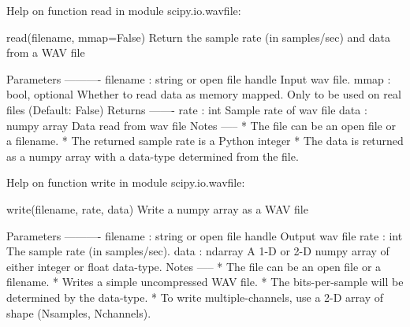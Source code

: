 \documentclass[10pt,fleqn]{article} %
\begin{document}
\ifprof
\else
\footnotesize
\vspace{1cm}
\begin{multicols}{2}
\begin{python}
Help on function read in module scipy.io.wavfile:

read(filename, mmap=False)
    Return the sample rate (in samples/sec) and data 
    from a WAV file    

    Parameters
    ----------
    filename : string or open file handle
        Input wav file.
    mmap : bool, optional
        Whether to read data as memory mapped.
        Only to be used on real files (Default: False)
    Returns
    -------
    rate : int
        Sample rate of wav file
    data : numpy array
        Data read from wav file    
    Notes
    -----    
    * The file can be an open file or a filename.
    * The returned sample rate is a Python integer
    * The data is returned as a numpy array with a
      data-type determined from the file.  
\end{python}

\vfill\null
\columnbreak

\begin{python}
Help on function write in module scipy.io.wavfile:

write(filename, rate, data)
    Write a numpy array as a WAV file
    
    Parameters
    ----------
    filename : string or open file handle
        Output wav file
    rate : int
        The sample rate (in samples/sec).
    data : ndarray
        A 1-D or 2-D numpy array of either integer 
        or float data-type.    
    Notes
    -----
    * The file can be an open file or a filename.
    * Writes a simple uncompressed WAV file.
    * The bits-per-sample will be determined by 
       the data-type.
    * To write multiple-channels, use a 2-D array 
      of shape (Nsamples, Nchannels).  
\end{python}
\end{multicols}
\fi
\ifprof

\else
\fi
\end{document}
